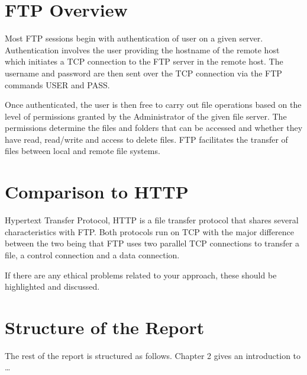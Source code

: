 \section{FTP Overview}
Most FTP sessions begin with authentication of user on a given server. Authentication involves the user providing the hostname of the remote host which initiates a TCP
connection to the FTP server in the remote host. The username and password are then sent over the TCP connection via the FTP commands USER and PASS. \par Once authenticated, the user
is then free to carry out file operations based on the level of permissions granted by the Administrator of the given file server. The permissions determine the files and folders
that can be accessed and whether they have read, read/write and access to delete files. FTP facilitates the transfer of files between local and remote file systems. 

\section{Comparison to HTTP}
Hypertext Transfer Protocol, HTTP is a file transfer protocol that shares several characteristics with FTP. Both protocols run on TCP with the major difference between the two being that
FTP uses two parallel TCP connections to transfer a file, a control connection and a data connection. 

If there are any ethical problems related to your approach, these should be highlighted and discussed.
\section{Structure of the Report}
The rest of the report is structured as follows. Chapter 2 gives an introduction to \ldots
